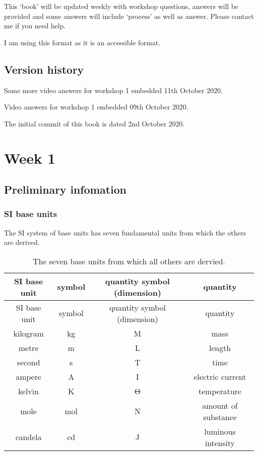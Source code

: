 \documentclass[
]{book}
\begin{document}
This `book' will be updated weekly with workshop questions, answers will be provided and some answers will include `process' as well as answer. Please contact me if you need help.

I am using this format as it is an accessible format.

\hypertarget{version-history}{%
\section*{Version history}\label{version-history}}

Some more video answers for workshop 1 embedded 11th October 2020.

Video answers for workshop 1 embedded 09th October 2020.

The initial commit of this book is dated 2nd October 2020.

\hypertarget{ch:Workshop1}{%
\chapter{Week 1}\label{ch:Workshop1}}

\hypertarget{sec:Prelim}{%
\section{Preliminary infomation}\label{sec:Prelim}}

\hypertarget{si-base-units}{%
\subsection{SI base units}\label{si-base-units}}

The SI system of base units has seven fundamental units from which the others are derived.

\begin{longtable}[]{@{}cccc@{}}
\caption{\label{tab:SIbase} The seven base units from which all others are dervied.}\tabularnewline
\toprule
SI base unit & symbol & quantity symbol (dimension) & quantity\tabularnewline
\midrule
\endfirsthead
\toprule
SI base unit & symbol & quantity symbol (dimension) & quantity\tabularnewline
\midrule
\endhead
kilogram & kg & M & mass\tabularnewline
metre & m & L & length\tabularnewline
second & s & T & time\tabularnewline
ampere & A & I & electric current\tabularnewline
kelvin & K & Θ & temperature\tabularnewline
mole & mol & N & amount of substance\tabularnewline
candela & cd & J & luminous intensity\tabularnewline
\bottomrule
\end{longtable}
\end{document}
